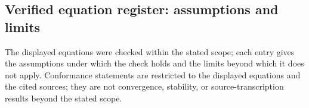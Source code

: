
\subsection{Verified equation register: assumptions and limits}
\label{sec:12.verified_register}

The displayed equations were checked within the stated scope; each entry gives the
assumptions under which the check holds and the limits beyond which it does not apply.
Conformance statements are restricted to the displayed equations and the cited sources;
they are not convergence, stability, or source-transcription results beyond the stated scope.

